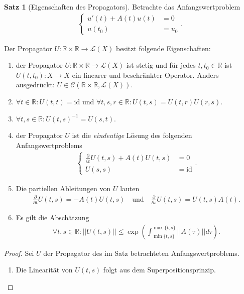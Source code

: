\documentclass[a4paper]{article}
\theoremstyle{definition}
\newtheorem{theorem}{Satz}
\begin{document}
\begin{theorem}[Eigenschaften des Propagators]
Betrachte das Anfangswertproblem
\begin{align*}
    \begin{cases}
        u'(t) + A(t)u(t) &= 0 \\
        u(t_0) &= u_0
    \end{cases} \tag{$\star$}.
\end{align*}

Der Propagator $U: \mathbb{R} \times \mathbb{R} \to \mathcal L(X)$ besitzt folgende Eigenschaften:

\begin{enumerate}
    \item der Propagator $U: \mathbb{R} \times \mathbb{R} \to \mathcal L(X)$ ist stetig und für jedes $t,t_0 \in \mathbb{R}$ ist $U(t,t_0): X \to X$ ein linearer und beschränkter Operator. Anders ausgedrückt: $U \in \mathcal{C}(\mathbb{R} \times \mathbb{R}, \mathcal{L}(X))$.
    \item $\forall t \in \mathbb{R}: U(t,t) = \mathrm{id}$ und $\forall t,s,r \in \mathbb{R}: U(t,s) = U(t,r) U(r,s)$.
    \item $\forall t,s \in \mathbb{R}: U(t,s)^{-1} = U(s,t)$.
    \item der Propagator $U$ ist die \emph{eindeutige} Lösung des folgenden Anfangswertproblems
    \begin{align*}
        \begin{cases}
            \frac{\partial}{\partial t}U(t,s) + A(t)U(t,s) &= 0 \\
            U(s,s) &= \mathrm{id}
        \end{cases}.
    \end{align*}
    \item Die partiellen Ableitungen von $U$ lauten 
    \begin{align*}
        \frac{\partial}{\partial t}U(t,s)=-A(t)U(t,s) \quad \text{und} \quad \frac{\partial}{\partial s}U(t,s)=U(t,s)A(t).
    \end{align*}
    \item Es gilt die Abschätzung 
    \begin{align*}
        \forall t,s \in \mathbb{R}: ||U(t,s)|| \leq \exp{\left(\int^{\max\{ t,s \}}_{\min \{t,s \}} ||A(\tau)|| d\tau \right)}.
    \end{align*}
\end{enumerate}
\end{theorem}

\begin{proof}
Sei $U$ der Propagator des im Satz betrachteten Anfangswertproblems.
\begin{enumerate}
    \item Die Linearität von $U(t,s)$ folgt aus dem Superpositionsprinzip.
\end{enumerate}
\end{proof}
\end{document}

